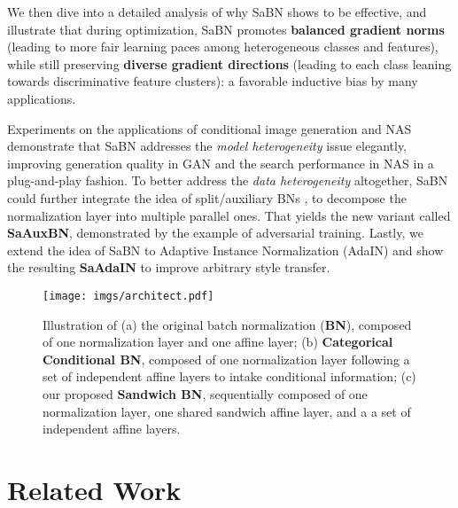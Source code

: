 \documentclass{article}
\begin{document}
We then dive into a detailed analysis of why SaBN shows to be effective, and illustrate that during optimization, SaBN promotes \textbf{balanced gradient norms} (leading to more fair learning paces among heterogeneous classes and features), while still preserving \textbf{diverse gradient directions} (leading to each class leaning towards discriminative feature clusters): a favorable inductive bias by many applications.
 
Experiments on the applications of conditional image generation and NAS demonstrate that SaBN addresses the \textit{model heterogeneity} issue elegantly, improving generation quality in GAN and the search performance in NAS in a plug-and-play fashion.
To better address the \textit{data heterogeneity} altogether, SaBN could further integrate the idea of split/auxiliary BNs \citep{zajkac2019split,xie2019adversarial,xie2019intriguing,yu2018slimmable}, to decompose the normalization layer into multiple parallel ones. That yields the new variant called \textbf{SaAuxBN}, demonstrated by the example of adversarial training. Lastly, we extend the idea of SaBN to Adaptive Instance Normalization (AdaIN) \citep{huang2017arbitrary} and show the resulting \textbf{SaAdaIN} to improve arbitrary style transfer.

\begin{figure}[t!]
\centering
\texttt{[image: imgs/architect.pdf]}
 \vspace{-1em}
   \caption{Illustration of (a) the original batch normalization (\textbf{BN}), composed of one normalization layer and one affine layer; (b) \textbf{Categorical Conditional BN}, composed of one normalization layer following a set of independent affine layers to intake conditional information;  (c) our proposed \textbf{Sandwich BN}, sequentially composed of one normalization layer, one shared sandwich affine layer, and a a set of independent affine layers.}
\label{fig:architect}
\end{figure} \section{Related Work}
\end{document}
